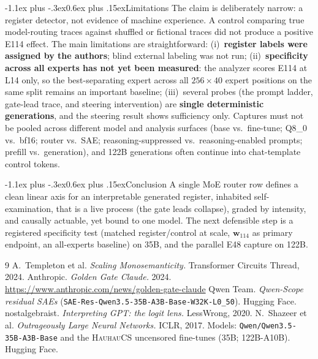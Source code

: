 \documentclass[10pt]{article}
\makeatletter
\renewcommand\section{\@startsection{section}{1}{\z@}%
  {-1.1ex plus -.3ex}{0.6ex plus .15ex}{\normalfont\large\bfseries}}
\newcommand{\wvec}{\mathbf{w}_{114}}
\makeatother
\begin{document}
\section{Limitations}
\vspace{-0.2em}
The claim is deliberately narrow: a register detector, not evidence of machine
experience. A control comparing true model-routing traces against shuffled or
fictional traces did not produce a positive E114 effect. The main limitations are
straightforward: (i)~\textbf{register labels were assigned by the authors}; blind
external labeling was not run; (ii)~\textbf{specificity across all experts has not
yet been measured}: the analyzer scores E114 at L14 only, so the
best-separating expert across all $256{\times}40$ expert positions on the same split remains
an important baseline; (iii)~several probes (the prompt ladder, gate-lead trace,
and steering intervention) are \textbf{single deterministic generations}, and the
steering result shows sufficiency only. Captures must not be pooled across
different model and analysis surfaces (base vs.\ fine-tune; Q8\_0 vs.\ bf16;
router vs.\ SAE; reasoning-suppressed vs.\ reasoning-enabled prompts; prefill
vs.\ generation), and 122B generations often continue into chat-template control
tokens.

\vspace{-0.4em}
\section{Conclusion}
\vspace{-0.2em}
A single MoE router row defines a clean linear axis for an interpretable generated
register, inhabited self-examination, that is a live process (the gate leads
collapse), graded by intensity, and causally actuable, yet bound to one model. The
next defensible step is a registered specificity test (matched register/control at
scale, $\wvec$ as primary endpoint, an all-experts baseline) on 35B, and the
parallel E48 capture on 122B.

\vspace{-0.5em}
{\tiny \raggedright
\begin{thebibliography}{9}\setlength{\itemsep}{-1.0ex}\setlength{\parsep}{0pt}
 A.~Templeton et al. \emph{Scaling Monosemanticity.} Transformer Circuits Thread, 2024.
 Anthropic. \emph{Golden Gate Claude.} 2024. \url{https://www.anthropic.com/news/golden-gate-claude}
 Qwen Team. \emph{Qwen-Scope residual SAEs} (\texttt{SAE-Res-Qwen3.5-35B-A3B-Base-W32K-L0\_50}). Hugging Face.
 nostalgebraist. \emph{Interpreting GPT: the logit lens.} LessWrong, 2020.
 N.~Shazeer et al. \emph{Outrageously Large Neural Networks.} ICLR, 2017.
 Models: \texttt{Qwen/Qwen3.5-35B-A3B-Base} and the \textsc{HauhauCS} uncensored fine-tunes (35B; 122B-A10B). Hugging Face.
\end{thebibliography}
}
\end{document}
